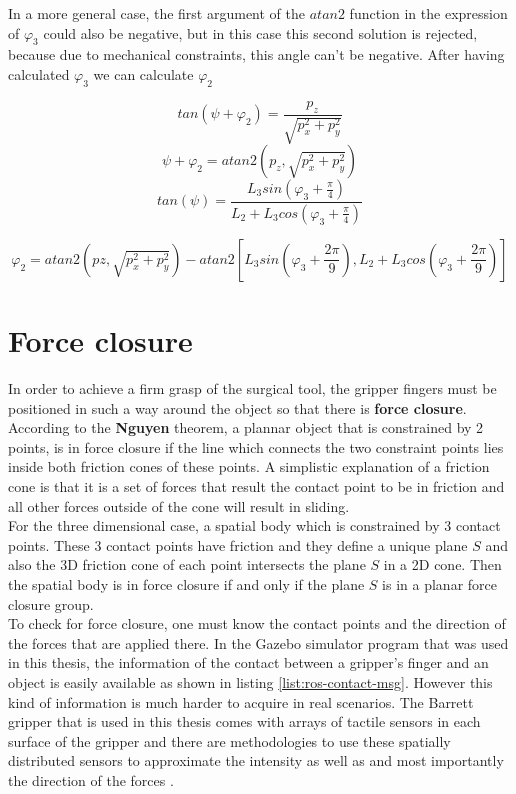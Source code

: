In a more general case, the first argument of the $atan2$ function in the expression of $φ_3$ could also be negative,
but in this case this second solution is rejected, because due to mechanical constraints, this angle can't be negative. 
After having calculated $φ_3$ we can calculate $φ_2 $

\begin{equation}
tan \left( ψ + φ_2 \right) = \frac{p_z}{\sqrt{p_x^2 + p_y^2}}
\end{equation}
\begin{equation}
ψ + φ_2 = atan2 \left( p_z, \sqrt{p_x^2 + p_y^2} \right)
\end{equation}
\begin{equation}
tan \left( ψ \right) = \frac{L_3 sin \left( φ_3 + \frac{π}{4} \right) }{L_2 + L_3 cos \left( φ_3 + \frac{π}{4} \right)}
\end{equation}

\begin{equation}
φ_2 = atan2 \left( pz, \sqrt{p_x^2 + p_y^2} \right) - atan2 \left[ L_3 sin \left( φ_3 + \frac{2π}{9} \right), L_2 + L_3 cos \left( φ_3 + \frac{2π}{9} \right) \right]
\end{equation}

\section{Force closure}

In order to achieve a firm grasp of the surgical tool, the gripper fingers must be positioned in such a way around the object so that there is \textbf{force closure}. According to the \textbf{Nguyen} theorem, a plannar 
object that is constrained by 2 points, is in force closure if the line which connects the two constraint points lies inside both friction cones of these points. A simplistic explanation of a friction cone is 
that it is a set of forces that result the contact point to be in friction and all other forces outside of the cone will result in sliding. \\

For the three dimensional case, a spatial body which is constrained by 3 contact points. These 3 contact points have friction and they define a unique plane $S$ and also the 3D friction cone of each point 
intersects the plane $S$ in a 2D cone. Then the spatial body is in force closure if and only if the plane $S$ is in a planar force closure group.\\

To check for force closure, one must know the contact points and the direction of the forces that are applied there. In the Gazebo simulator program that was used in this thesis, the information of the contact 
between a gripper's finger and an object is easily available as shown in listing \ref{list:ros-contact-msg}. However this kind of information is much harder to acquire in real scenarios. The Barrett gripper that is used in this thesis comes with arrays 
of tactile sensors in each surface of the gripper and there are methodologies to use these spatially distributed sensors to approximate the intensity as well as and most importantly the direction of the forces \cite{tactile-sensors-force}.

